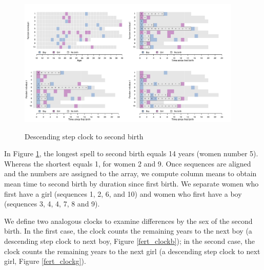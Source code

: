 \documentclass{article}
\begin{document}
\begin{figure}[H]
\centering
    \includegraphics[trim=17cm 10cm 1cm 1cm, clip, width=0.95\textwidth]{Spells/Figures/colombia/illu_fertility.pdf}\\
    \caption{Descending step clock to second birth}
    \label{fert_aling}
\end{figure}

In Figure \ref{fert_aling}, the longest spell to second birth equals 14 years (women number 5). Whereas the shortest equals 1, for women 2 and 9. Once sequences are aligned and the numbers are assigned to the array, we compute column means to obtain mean time to second birth by duration since first birth. We separate women who first have a girl (sequences 1, 2, 6, and 10) and women who first have a boy (sequences 3, 4, 4, 7, 8 and 9).

We define two analogous clocks to examine differences by the sex of the second birth. In the first case, the clock counts the remaining years to the next boy (a descending step clock to next boy, Figure \ref{fert_clockb}); in the second case, the clock counts the remaining years to the next girl (a descending step clock to next girl, Figure \ref{fert_clockg}). 
\end{document}
